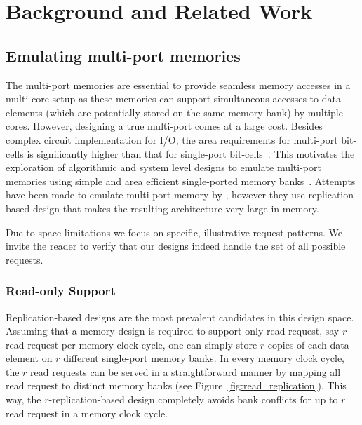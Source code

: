 \section{Background and Related Work}
\label{sec:bg}

\subsection{Emulating multi-port memories}
\label{sec:emulation}

The multi-port memories are essential to provide seamless memory accesses in a multi-core setup as these memories can support simultaneous accesses to data elements (which are potentially stored on the same memory bank) by multiple cores. However, designing a true multi-port comes at a large cost. Besides complex circuit implementation for I/O, the area requirements for multi-port bit-cells is significantly higher than that for single-port bit-cells~\cite{Suzuki,WLCH14}. This motivates the exploration of algorithmic and system level designs to emulate multi-port memories using simple and area efficient single-ported memory banks~\cite{ACP88, EMY91, RG91,Memoir_xor, Memoir_xor_virtual}. Attempts have been made to emulate multi-port memory by \cite{CCES93}, however they use replication based design that makes the resulting architecture very large in memory. 


Due to space limitations we focus on specific, illustrative request patterns. We invite the reader to verify that our designs indeed handle the set of all possible requests.

\subsubsection{Read-only Support} 
\label{sec:read_only}
Replication-based designs are the most prevalent candidates in this design space. Assuming that a memory design is required to support only read request, say $r$ read request per memory clock cycle, one can simply store $r$ copies of each data element on $r$ different single-port memory banks. In every memory clock cycle, the $r$ read requests can be served in a straightforward manner by mapping all read request to distinct memory banks (see Figure~\ref{fig:read_replication}). This way, the $r$-replication-based design completely avoids bank conflicts for up to $r$ read request in a memory clock cycle. 

